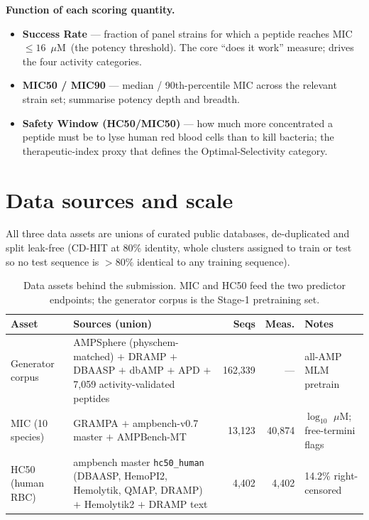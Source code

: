\documentclass[11pt]{article}
\newcommand{\uM}{\ensuremath{\mu}M}
\begin{document}
\textbf{Function of each scoring quantity.}
\begin{itemize}\itemsep1pt
  \item \textbf{Success Rate} --- fraction of panel strains for which a peptide reaches
        MIC $\le 16$~\uM\ (the potency threshold). The core ``does it work'' measure; drives the
        four activity categories.
  \item \textbf{MIC50 / MIC90} --- median / 90th-percentile MIC across the relevant strain set;
        summarise potency depth and breadth.
  \item \textbf{Safety Window (HC50/MIC50)} --- how much more concentrated a peptide must be to lyse
        human red blood cells than to kill bacteria; the therapeutic-index proxy that defines the
        Optimal-Selectivity category.
\end{itemize}

\section{Data sources and scale}

All three data assets are unions of curated public databases, de-duplicated and split leak-free
(CD-HIT at 80\% identity, whole clusters assigned to train or test so no test sequence is $>\!80\%$
identical to any training sequence).

\begin{table}[h]\centering\small
\setlength{\tabcolsep}{4pt}
\caption{Data assets behind the submission. MIC and HC50 feed the two predictor endpoints; the
generator corpus is the Stage-1 pretraining set.}
\begin{tabular}{@{}p{2.1cm}p{6.6cm}rrp{2.3cm}@{}}
\toprule
\textbf{Asset} & \textbf{Sources (union)} & \textbf{Seqs} & \textbf{Meas.} & \textbf{Notes} \\
\midrule
Generator corpus & AMPSphere (physchem-matched) $+$ DRAMP $+$ DBAASP $+$ dbAMP $+$ APD $+$
7{,}059 activity-validated peptides & 162{,}339 & --- & all-AMP MLM pretrain \\
MIC (10 species) & GRAMPA $+$ ampbench-v0.7 master $+$ AMPBench-MT & 13{,}123 & 40{,}874 &
$\log_{10}$ \uM; free-termini flags \\
HC50 (human RBC) & ampbench master \texttt{hc50\_human} (DBAASP, HemoPI2, Hemolytik, QMAP,
DRAMP) $+$ Hemolytik2 $+$ DRAMP text & 4{,}402 & 4{,}402 & 14.2\% right-censored \\
\bottomrule
\end{tabular}
\end{table}
\end{document}
